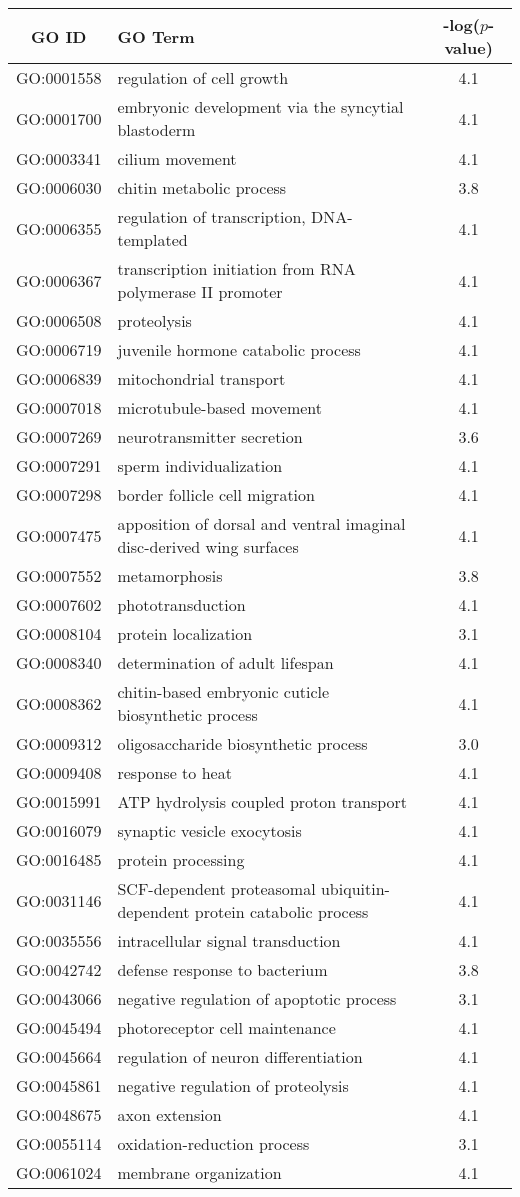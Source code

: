 \centering \begin{tabular}{c|p{4in}|c}
GO ID	&GO Term	&-log($p$-value)\\\hline
GO:0001558	&regulation of cell growth	&4.1\\
GO:0001700	&embryonic development via the syncytial blastoderm	&4.1\\
GO:0003341	&cilium movement	&4.1\\
GO:0006030	&chitin metabolic process	&3.8\\
GO:0006355	&regulation of transcription, DNA-templated	&4.1\\
GO:0006367	&transcription initiation from RNA polymerase II promoter	&4.1\\
GO:0006508	&proteolysis	&4.1\\
GO:0006719	&juvenile hormone catabolic process	&4.1\\
GO:0006839	&mitochondrial transport	&4.1\\
GO:0007018	&microtubule-based movement	&4.1\\
GO:0007269	&neurotransmitter secretion	&3.6\\
GO:0007291	&sperm individualization	&4.1\\
GO:0007298	&border follicle cell migration	&4.1\\
GO:0007475	&apposition of dorsal and ventral imaginal disc-derived wing surfaces	&4.1\\
GO:0007552	&metamorphosis	&3.8\\
GO:0007602	&phototransduction	&4.1\\
GO:0008104	&protein localization	&3.1\\
GO:0008340	&determination of adult lifespan	&4.1\\
GO:0008362	&chitin-based embryonic cuticle biosynthetic process	&4.1\\
GO:0009312	&oligosaccharide biosynthetic process	&3.0\\
GO:0009408	&response to heat	&4.1\\
GO:0015991	&ATP hydrolysis coupled proton transport	&4.1\\
GO:0016079	&synaptic vesicle exocytosis	&4.1\\
GO:0016485	&protein processing	&4.1\\
GO:0031146	&SCF-dependent proteasomal ubiquitin-dependent protein catabolic process	&4.1\\
GO:0035556	&intracellular signal transduction	&4.1\\
GO:0042742	&defense response to bacterium	&3.8\\
GO:0043066	&negative regulation of apoptotic process	&3.1\\
GO:0045494	&photoreceptor cell maintenance	&4.1\\
GO:0045664	&regulation of neuron differentiation	&4.1\\
GO:0045861	&negative regulation of proteolysis	&4.1\\
GO:0048675	&axon extension	&4.1\\
GO:0055114	&oxidation-reduction process	&3.1\\
GO:0061024	&membrane organization	&4.1\\
\end{tabular}
